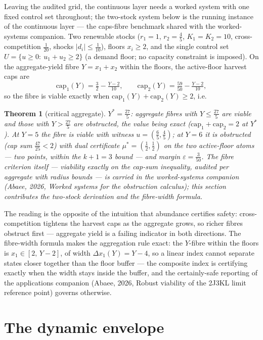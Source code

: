 \documentclass[10pt,twocolumn]{article}
\theoremstyle{plain}
\newtheorem{theorem}{Theorem}
\theoremstyle{definition}
\theoremstyle{remark}
\begin{document}
Leaving the audited grid, the continuous layer needs a worked system with
one fixed control set throughout; the two-stock system below is the
running instance of the continuous layer --- the caps-fibre benchmark
shared with the worked-systems companion. Two renewable stocks
($r_{1} = 1$, $r_{2} = \tfrac45$, $K_{1} = K_{2} = 10$, cross-competition
$\tfrac1{20}$, shocks $|d_{i}| \le \tfrac1{10}$), floors
$x_{i} \ge 2$, and the single control set
$U = \{u \ge 0:\ u_{1} + u_{2} \ge 2\}$ (a demand floor; no capacity
constraint is imposed). On the aggregate-yield fibre
$Y = x_{1} + x_{2}$ within the floors, the active-floor harvest caps are
\[
\mathrm{cap}_{1}(Y) = \tfrac32 - \tfrac{Y-2}{10},\qquad
\mathrm{cap}_{2}(Y) = \tfrac{59}{50} - \tfrac{Y-2}{10},
\]
so the fibre is viable exactly when
$\mathrm{cap}_{1}(Y) + \mathrm{cap}_{2}(Y) \ge 2$, i.e.
\begin{theorem}[critical aggregate]\label{dual-thm:benchmark}
$Y^{*} = \tfrac{27}{5}$: aggregate fibres with $Y \le \tfrac{27}{5}$ are
viable and those with $Y > \tfrac{27}{5}$ are obstructed, the value being
exact ($\mathrm{cap}_{1} + \mathrm{cap}_{2} = 2$ at $Y^{*}$). At
$Y = 5$ the fibre is viable with witness $u = (\tfrac65,\tfrac45)$; at
$Y = 6$ it is obstructed (cap sum $\tfrac{47}{25} < 2$) with dual
certificate $\mu^{*} = (\tfrac12,\tfrac12)$ on the two active-floor
atoms --- two points, within the $k+1 = 3$ bound --- and margin
$\varepsilon = \tfrac{3}{50}$. The fibre criterion itself --- viability
exactly on the cap-sum inequality, audited per aggregate with radius
bounds --- is carried in the worked-systems companion (Abaee, 2026, Worked systems for the obstruction calculus);
this section contributes the two-stock derivation and the fibre-width
formula.
\end{theorem}
The reading is the opposite of the intuition that abundance certifies
safety: cross-competition tightens the harvest caps as the aggregate
grows, so richer fibres obstruct first --- aggregate yield is a failing
indicator in both directions. The fibre-width formula makes the
aggregation rule exact: the $Y$-fibre within the floors is
$x_{1} \in [2,\,Y-2]$, of width $\Delta x_{1}(Y) = Y - 4$, so a linear
index cannot separate states closer together than the floor buffer ---
the composite index is certifying exactly when the width stays inside the
buffer, and the certainly-safe reporting of the applications companion
(Abaee, 2026, Robust viability of the 2J3KL limit reference point) governs otherwise.

\section{The dynamic envelope}
\end{document}
